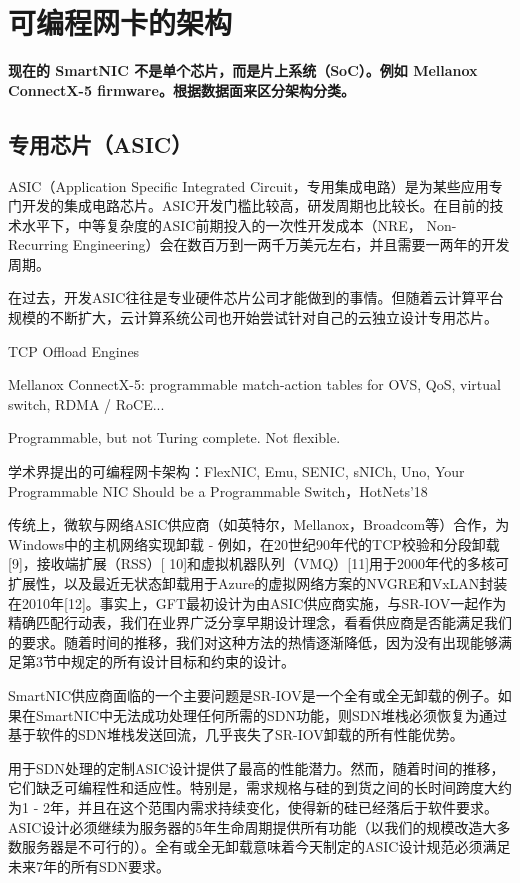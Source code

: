 \section{可编程网卡的架构}
\label{smartnic-architecture}

\textbf{现在的 SmartNIC 不是单个芯片，而是片上系统（SoC）。例如 Mellanox ConnectX-5 firmware。根据数据面来区分架构分类。}

\subsection{专用芯片（ASIC）}
\label{smartnic-asic}


ASIC（Application Specific Integrated Circuit，专用集成电路）是为某些应用专门开发的集成电路芯片。ASIC开发门槛比较高，研发周期也比较长。在目前的技术水平下，中等复杂度的ASIC前期投入的一次性开发成本（NRE， Non-Recurring Engineering）会在数百万到一两千万美元左右，并且需要一两年的开发周期。


在过去，开发ASIC往往是专业硬件芯片公司才能做到的事情。但随着云计算平台规模的不断扩大，云计算系统公司也开始尝试针对自己的云独立设计专用芯片。

TCP Offload Engines

Mellanox ConnectX-5: programmable match-action tables for OVS, QoS, virtual switch, RDMA / RoCE...

Programmable, but not Turing complete. Not flexible.

学术界提出的可编程网卡架构：FlexNIC, Emu, SENIC, sNICh, Uno, Your Programmable NIC Should be a Programmable Switch，HotNets'18


传统上，微软与网络ASIC供应商（如英特尔，Mellanox，Broadcom等）合作，为Windows中的主机网络实现卸载 - 例如，在20世纪90年代的TCP校验和分段卸载[9]，接收端扩展（RSS）[ 10]和虚拟机器队列（VMQ）[11]用于2000年代的多核可扩展性，以及最近无状态卸载用于Azure的虚拟网络方案的NVGRE和VxLAN封装在2010年[12]。事实上，GFT最初设计为由ASIC供应商实施，与SR-IOV一起作为精确匹配行动表，我们在业界广泛分享早期设计理念，看看供应商是否能满足我们的要求。随着时间的推移，我们对这种方法的热情逐渐降低，因为没有出现能够满足第3节中规定的所有设计目标和约束的设计。

SmartNIC供应商面临的一个主要问题是SR-IOV是一个全有或全无卸载的例子。如果在SmartNIC中无法成功处理任何所需的SDN功能，则SDN堆栈必须恢复为通过基于软件的SDN堆栈发送回流，几乎丧失了SR-IOV卸载的所有性能优势。



用于SDN处理的定制ASIC设计提供了最高的性能潜力。然而，随着时间的推移，它们缺乏可编程性和适应性。特别是，需求规格与硅的到货之间的长时间跨度大约为1  -  2年，并且在这个范围内需求持续变化，使得新的硅已经落后于软件要求。 ASIC设计必须继续为服务器的5年生命周期提供所有功能（以我们的规模改造大多数服务器是不可行的）。全有或全无卸载意味着今天制定的ASIC设计规范必须满足未来7年的所有SDN要求。


